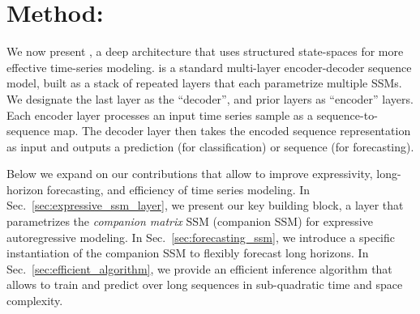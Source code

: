 
\section{Method: \ourmethod{}}
\label{sec:method_spacetime}
%

We now present \ourmethod{}, a deep architecture that uses structured state-spaces for more effective time-series modeling.
%
\ourmethod{} is a standard multi-layer encoder-decoder sequence model, built as a stack of repeated layers that each parametrize multiple SSMs. We designate the last layer as the ``decoder'', and prior layers as ``encoder'' layers. 
Each encoder layer processes an input time series sample as a sequence-to-sequence map. The decoder layer then takes the encoded sequence representation as input and outputs a prediction (for classification) or sequence (for forecasting). 

Below we expand on our contributions that allow \ourmethod{} to improve expressivity, long-horizon forecasting, and efficiency of time series modeling.
%
In Sec.~\ref{sec:expressive_ssm_layer}, we present our key building block, a layer that parametrizes the \emph{companion matrix} SSM (companion SSM) for expressive autoregressive modeling. 
%
In Sec.~\ref{sec:forecasting_ssm}, we introduce a specific instantiation of the companion SSM to flexibly forecast long horizons. 
%
In Sec.~\ref{sec:efficient_algorithm}, we provide an efficient inference algorithm that allows \ourmethod{} to train and predict over long sequences in sub-quadratic time and space complexity. 
%


